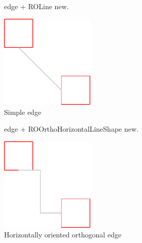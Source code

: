 \documentclass[a4paper,10pt,twoside]{book}
\begin{document}
\begin{figure}[H]
      \begin{minipage}[t]{0.5\textwidth}
      \vspace{0pt}
     \begin{code}{}
edge + ROLine new. \end{code}
   \end{minipage}
   \hfill
   \begin{minipage}[t]{0.4\textwidth}
      \vspace{0pt} \raggedright
       \centering
		\includegraphics[width=0.4\textwidth]{line}
   \end{minipage}
\caption{Simple edge}
\label{fig:line}
\end{figure} 


\begin{figure}[H]
      \begin{minipage}[t]{0.5\textwidth}
      \vspace{0pt}
     \begin{code}{}
edge + ROOrthoHorizontalLineShape new. \end{code}
   \end{minipage}
   \hfill
   \begin{minipage}[t]{0.4\textwidth}
      \vspace{0pt} \raggedright
       \centering
		\includegraphics[width=0.4\textwidth]{orthoEdge}
   \end{minipage}
\caption{Horizontally oriented orthogonal edge}
\label{fig:orthoEdge}
\end{figure} 
\end{document}
